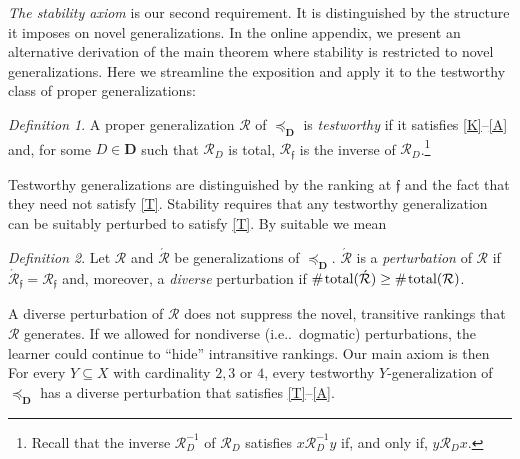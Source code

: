 \documentclass[ecta,nameyear,draft]{econsocart}
\makeatletter
\newcommand{\countof}{\mathbin{\#}\hskip1pt}
\newcommand{\mc}{\mathcal}
\newcommand{\novel}{\mathfrak f}
\newcommand{\preceqb}{\mathbin{\preceq}}
\newcommand{\ext}{\mathrel{\mc R}}
\newcommand{\extb}{\mathbin{\mc R}}
\newcommand{\hextb}{\mathbin{\hat{\mathbin{\mathcal R}}}}
\newcommand{\aext}{\mathrel{\acute{\mathrel{\mathcal R}}}}
\newcommand{\aextb}{\mathbin{\acute{\mathbin{\mathcal R}}}}
\newcommand{\total}{\textup{total}}
\newcommand{\mbbd}{{\mathbf D}}
\newcommand\ie{i\@.e\@ifnextchar.{}{.\@}}
\theoremstyle{plain}
\newenvironment{taggedstability}[1]
 {\renewcommand\thetaggedtheoremx{#1}\taggedtheoremx}
 {\endtaggedtheoremx}
\theoremstyle{remark}
\newtheorem*{definition*}{Definition}
\makeatother
\begin{document}
\emph{The {stability} axiom } is our second requirement. It is distinguished by
the structure it imposes on novel generalizations. In the online appendix, we
present an alternative derivation of the main theorem where stability is
restricted to novel generalizations. Here we streamline the exposition and
apply it to the testworthy class of proper generalizations:
\begin{definition*}\label{def-testworthy} A proper generalization $\ext$ of
  $\preceqb_{\mbbd}$ is \emph{testworthy} if it satisfies
  \textup{\ref{K}--\ref{A}} and, for some $D\in \mbbd$ such that $\ext_{D}$ is
  total, $\extb _{\novel}$ is the inverse of $\extb_{D}$.\footnote{Recall that
    the inverse $\ext _{D}^{- 1}$ of $\ext
    _{D}$ satisfies $x \ext _{D}^{- 1} y$ if, and only if, $y \ext _{D}
  x$.}
\end{definition*}

Testworthy generalizations are distinguished by the ranking at $\novel$ and the
fact that they need not satisfy \ref{T}.  Stability requires that any
testworthy generalization can be suitably perturbed to satisfy \ref{T}. By
suitable we mean
\begin{definition*} Let $\ext$ and $\aext$ be generalizations of
  $\preceqb_{\mbbd}$. $\aext$ is a \emph{perturbation} of $\ext$ if
  $\aextb_{\novel} = \extb_{\novel}$ and, moreover, a \emph{{{diverse}}}
  perturbation if $\countof \total (\aextb) \geq \countof \total ( \extb)$.
\end{definition*}
A diverse perturbation of $\ext$ does not suppress the novel, transitive
rankings that $\ext$ generates. If we allowed for nondiverse (\ie\ dogmatic)
perturbations, the learner could continue to ``hide'' intransitive rankings.
Our main axiom is then
\begin{taggedstability}{\textsc{4stability}}\label{S} For every $Y\subseteq X$
  with cardinality $2, 3$ or $4$, every testworthy $Y$-generalization of
  $\preceqb _{\mbbd}$ has a {{diverse}} perturbation that satisfies
  \ref{T}–\ref{A}.
\end{taggedstability}
\end{document}
